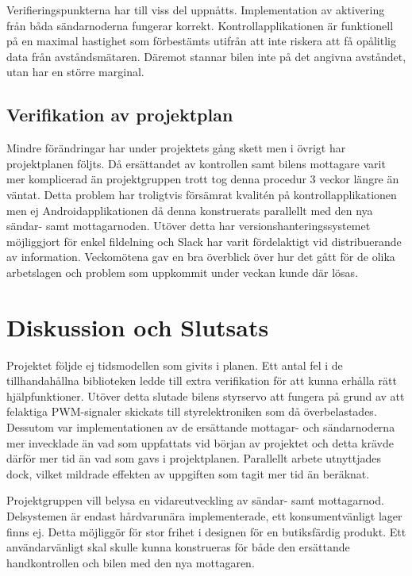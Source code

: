 \documentclass[a4paper]{article}
\begin{document}
\noindent
Verifieringspunkterna har till viss del uppnåtts. Implementation av aktivering från båda sändarnoderna fungerar korrekt. Kontrollapplikationen är funktionell på en maximal hastighet som förbestämts utifrån att inte riskera att få opålitlig data från avståndsmätaren. Däremot stannar bilen inte på det angivna avståndet, utan har en större marginal.


\subsection{Verifikation av projektplan}
Mindre förändringar har under projektets gång skett men i övrigt har projektplanen följts. Då ersättandet av kontrollen samt bilens  mottagare varit mer komplicerad än projektgruppen trott tog denna procedur 3 veckor längre än väntat. Detta problem har troligtvis försämrat kvalitén på kontrollapplikationen men ej Androidapplikationen då denna konstruerats parallellt med den nya sändar- samt mottagarnoden. Utöver detta har versionshanteringssystemet möjliggjort för enkel fildelning och Slack har varit fördelaktigt vid distribuerande av information. Veckomötena gav en bra överblick över hur det gått för de olika arbetslagen och problem som uppkommit under veckan kunde där lösas.



\newpage
\section{Diskussion och Slutsats}

Projektet följde ej tidsmodellen som givits i planen. Ett antal fel i de tillhandahållna biblioteken ledde till extra verifikation för att kunna erhålla rätt hjälpfunktioner. Utöver detta slutade bilens styrservo att fungera på grund av att felaktiga PWM-signaler skickats till styrelektroniken som då överbelastades. Dessutom var implementationen av de ersättande mottagar- och sändarnoderna mer invecklade än vad som uppfattats vid början av projektet och detta krävde därför mer tid än vad som gavs i projektplanen. Parallellt arbete utnyttjades dock, vilket mildrade effekten av uppgiften som tagit mer tid än beräknat. 

\vspace{5mm} \noindent
Projektgruppen vill belysa en vidareutveckling av sändar- samt mottagarnod. Delsystemen är endast hårdvarunära implementerade, ett konsumentvänligt lager finns ej. Detta möjliggör för stor frihet i designen för en butiksfärdig produkt. Ett användarvänligt skal skulle kunna konstrueras för både den ersättande handkontrollen och bilen med den nya mottagaren. 
\end{document}
